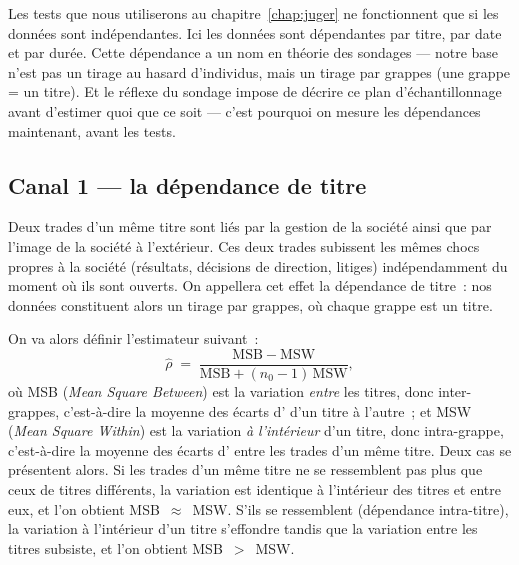 Les tests que nous utiliserons au chapitre~\ref{chap:juger} ne fonctionnent que
si les données sont indépendantes.
Ici les données sont dépendantes par titre, par date et par durée.
Cette dépendance a un nom en théorie des sondages — notre base
n'est pas un tirage au hasard d'individus, mais un tirage par
grappes (une grappe = un titre). Et le réflexe du sondage 
impose de décrire ce plan d'échantillonnage avant d'estimer
quoi que ce soit — c'est pourquoi on mesure les dépendances 
maintenant, avant les tests.

\subsection{Canal 1 --- la dépendance de titre}
\label{sec:dep-canal1}


Deux trades d'un même titre sont liés par la gestion de la société
ainsi que par l'image de la société à l'extérieur.
Ces deux trades subissent les mêmes chocs propres à la société (résultats,
décisions de direction, litiges) indépendamment du moment où ils sont
ouverts.
On appellera cet effet la dépendance de titre~: nos données constituent
alors un tirage par grappes, où chaque grappe est un titre.

On va alors définir l'estimateur suivant~:
\[
  \hat\rho \;=\; \frac{\mathrm{MSB}-\mathrm{MSW}}
                      {\mathrm{MSB} + (n_0 - 1)\,\mathrm{MSW}},
\]
où MSB (\emph{Mean Square Between}) est la variation \emph{entre} les
titres, donc inter-grappes, c'est-à-dire la moyenne des écarts d'\edgevar{}
d'un titre à l'autre~; et MSW (\emph{Mean Square Within}) est la variation
\emph{à l'intérieur} d'un titre, donc intra-grappe, c'est-à-dire la moyenne
des écarts d'\edgevar{} entre les trades d'un même titre.
Deux cas se présentent alors. Si les trades d'un même titre ne se ressemblent
pas plus que ceux de titres différents, la variation est identique à
l'intérieur des titres et entre eux, et l'on obtient MSB~$\approx$~MSW. S'ils
se ressemblent (dépendance intra-titre), la variation à l'intérieur d'un titre
s'effondre tandis que la variation entre les titres subsiste, et l'on obtient
MSB~$>$~MSW.

